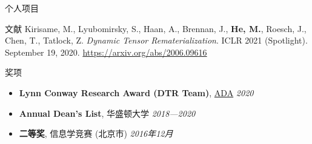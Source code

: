 \documentclass{resume}
\begin{document}
\begin{CJK*}{UTF8}{gbsn}
\begin{rSection}{个人项目}

	\end{rSection}
	\vspace{-5pt}

	\begin{rSection}{文献}
		Kirisame, M., Lyubomirsky, S., Haan, A., Brennan, J., \textbf{He, M.}, Roesch, J., Chen, T., Tatlock, Z. \textit{Dynamic Tensor Rematerialization}. ICLR 2021 (Spotlight). September 19, 2020. \href{https://arxiv.org/abs/2006.09616}{https://arxiv.org/abs/2006.09616}
	\end{rSection}
	

	\begin{rSection}{奖项}
		\begin{itemize}
			\setlength{\itemsep}{1pt}
			\setlength{\parskip}{0pt}
			\setlength{\parsep}{0pt}
			\item \textbf{Lynn Conway Research Award (DTR Team)}, \href{https://adacenter.org}{ADA} \hfill {\em 2020}
			\item \textbf{Annual Dean's List}, 华盛顿大学 \hfill {\em 2018---2020}
			\item \textbf{二等奖}, 信息学竞赛 (北京市) \hfill {\em 2016年12月}
		\end{itemize}
	\end{rSection}
	\clearpage\end{CJK*}
\end{document}
